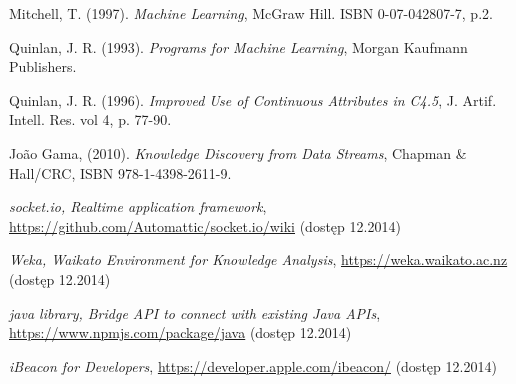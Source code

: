 \begin{thebibliography}{99}

 Mitchell, T. (1997). \textit{Machine Learning}, McGraw Hill. ISBN 0-07-042807-7, p.2.

 Quinlan, J. R. (1993). \textit{Programs for Machine Learning}, Morgan Kaufmann Publishers.

 Quinlan, J. R. (1996). \textit{Improved Use of Continuous Attributes in C4.5}, J. Artif. Intell. Res. vol 4, p. 77-90.

 João Gama, (2010). \textit{Knowledge Discovery from Data Streams}, Chapman \& Hall/CRC, ISBN 978-1-4398-2611-9.

 \textit{socket.io, Realtime application framework}, \url{https://github.com/Automattic/socket.io/wiki} (dostęp 12.2014)

 \textit{Weka, Waikato Environment for Knowledge Analysis}, \url{https://weka.waikato.ac.nz} (dostęp 12.2014)

 \textit{java library, Bridge API to connect with existing Java APIs}, \url{https://www.npmjs.com/package/java} (dostęp 12.2014)

 \textit{iBeacon for Developers}, \url{https://developer.apple.com/ibeacon/} (dostęp 12.2014)

\end{thebibliography}
